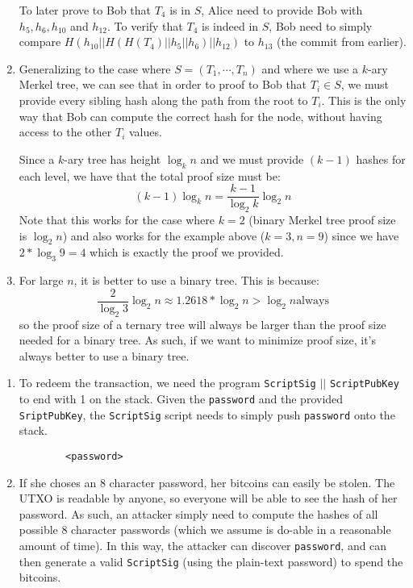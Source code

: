 \documentclass[12pt]{exam}
\newcommand{\Q}[1]{\question{\large{\textbf{#1}}}}
\begin{document}
\begin{questions}
\begin{solution}
\begin{enumerate}[label=\textbf{\alph*}.]
    To later prove to Bob that $T_4$ is in $S$, Alice need to provide Bob with $h_5, h_6, h_{10}$ and $h_{12}$. To verify that $T_4$ is indeed in $S$, Bob need to simply compare $H(h_{10} || H(H(T_4) || h_5 || h_6) || h_{12})$ to $h_{13}$ (the commit from earlier).
  \item
    Generalizing to the case where $S = (T_1, \cdots, T_n)$ and where we use a $k$-ary Merkel tree, we can see that in order to proof to Bob that $T_i \in S$, we must provide every sibling hash along the path from the root to $T_i$. This is the only way that Bob can compute the correct hash for the node, without having access to the other $T_i$ values.

    Since a $k$-ary tree has height $\log_k n$ and we must provide $(k-1)$ hashes for each level, we have that the total proof size must be:
    \[
      (k-1) \log_k n = \frac{k-1}{\log_2 k} \log_2 n
    \]
    Note that this works for the case where $k = 2$ (binary Merkel tree proof size is $\log_2 n$) and also works for the example above ($k = 3, n = 9$) since we have $2 * \log_3 9 = 4$ which is exactly the proof we provided.

  \item
    For large $n$, it is better to use a binary tree. This is because:
    \[
      \frac{2}{\log_2 3} \log_2 n \approx 1.2618 * \log_2 n > \log_2 n \text{always}
    \]
    so the proof size of a ternary tree will always be larger than the proof size needed for a binary tree. As such, if we want to minimize proof size, it's always better to use a binary tree.
\end{enumerate}
\end{solution}


\newpage
\Q{Bitcoin Script}
\begin{solution}
  \begin{enumerate}[label=\textbf{\alph*}.]
    \item 
      To redeem the transaction, we need the program \texttt{ScriptSig} $||$ \texttt{ScriptPubKey} to end with 1 on the stack. Given the \texttt{password} and the provided \texttt{SriptPubKey}, the \texttt{ScriptSig} script needs to simply push \texttt{password} onto the stack.
      \begin{verbatim}
        <password>
      \end{verbatim}
    \item If she choses an 8 character password, her bitcoins can easily be stolen. The UTXO is readable by anyone, so everyone will be able to see the hash of her password. As such, an attacker simply need to compute the hashes of all possible 8 character passwords (which we assume is do-able in a reasonable amount of time). In this way, the attacker can discover \texttt{password}, and can then generate a valid \texttt{ScriptSig} (using the plain-text password) to spend the bitcoins.


\end{enumerate}
\end{solution}
\end{questions}
\end{document}
